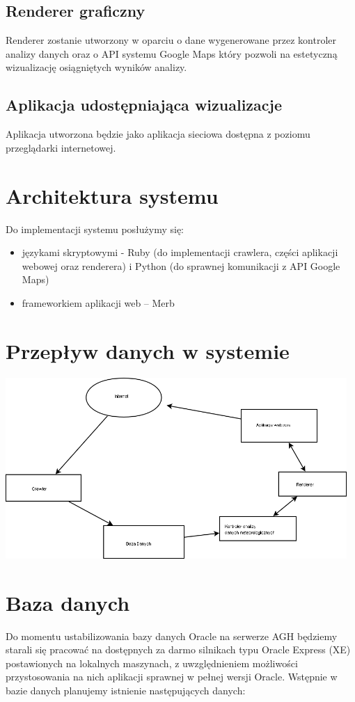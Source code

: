 \documentclass[12pt]{article}
\begin{document}
\subsection{Renderer graficzny}
Renderer zostanie utworzony w oparciu o dane wygenerowane przez kontroler
analizy danych oraz o API systemu Google Maps który pozwoli na estetyczną
wizualizację osiągniętych wyników analizy.

\subsection{Aplikacja udostępniająca wizualizacje}
Aplikacja utworzona będzie jako aplikacja sieciowa dostępna z poziomu
przeglądarki internetowej.

\section{Architektura systemu}

Do implementacji systemu posłużymy się:
\begin{itemize}
\item językami skryptowymi - Ruby (do implementacji crawlera, części aplikacji
    webowej oraz renderera) i Python (do sprawnej komunikacji z API Google
      Maps)
\item frameworkiem aplikacji web -- Merb
\end{itemize}


\section{Przepływ danych w systemie}
\includegraphics[width=35em]{images/data_flow_diagram.png}

\section{Baza danych}
Do momentu ustabilizowania bazy danych Oracle na serwerze AGH będziemy starali
się pracować na dostępnych za darmo silnikach typu Oracle Express (XE)
  postawionych na lokalnych maszynach, z uwzględnieniem możliwości
  przystosowania na nich aplikacji sprawnej w pełnej wersji Oracle. Wstępnie w
  bazie danych planujemy istnienie następujących danych:
\end{document}
